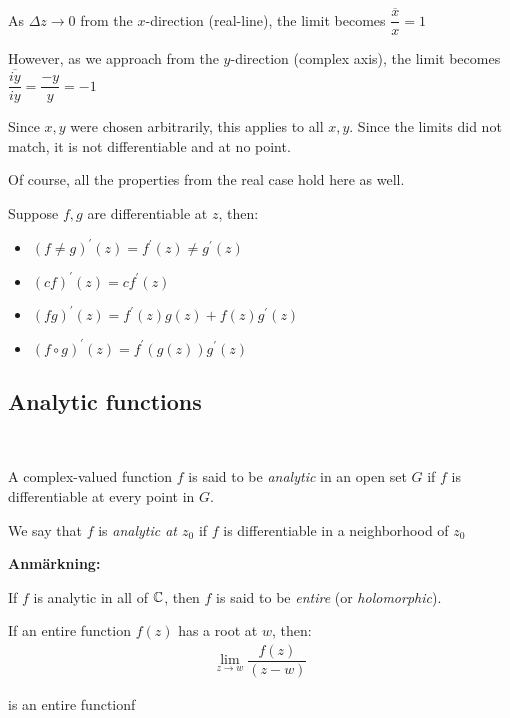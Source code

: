 \noindent As $\Delta z\to0$ from the $x$-direction (real-line), the limit becomes $\dfrac{\overline{x}}{x} = 1$\par
\noindent However, as we approach from the $y$-direction (complex axis), the limit becomes $\dfrac{\overline{iy}}{iy} = \dfrac{-y}{y} = -1$\par
\noindent Since $x,y$ were chosen arbitrarily, this applies to all $x,y$. Since the limits did not match, it is not differentiable and at no point.
\par\bigskip
\noindent Of course, all the properties from the real case hold here as well.\par
\noindent Suppose $f,g$ are differentiable at $z$, then:\par
\begin{itemize}
  \item $(f\neq g)^{\prime}(z) = f^{\prime}(z)\neq g^{\prime}(z)$
  \item $(cf)^{\prime}(z) = cf^{\prime}(z)$
  \item $(fg)^{\prime}(z) = f^{\prime}(z)g(z)+f(z)g^{\prime}(z)$
  \item $(f\circ g)^{\prime}(z) = f^{\prime}(g(z))g^{\prime}(z)$
\end{itemize}
\newpage
\subsection{Analytic functions}\hfill\\
\par\bigskip
\begin{theo}{}
  A complex-valued function $f$ is said to be \textit{analytic} in an open set $G$ if $f$ is differentiable at every point in $G$.
  \par\bigskip
  \noindent We say that $f$ is \textit{analytic at $z_0$}  if $f$ is differentiable in a neighborhood of $z_0$
\end{theo}
\par\bigskip
\noindent\textbf{Anmärkning:}\par
\noindent If $f$ is analytic in all of $\mathbb{C}$, then $f$ is said to be \textit{entire} (or \textit{holomorphic}).
\par\bigskip
\begin{theo}[]{}
  If an entire function $f(z)$ has a root at $w$, then:
  \begin{equation*}
    \begin{gathered}
      \lim_{z\to w}\dfrac{f(z)}{(z-w)}
    \end{gathered}
  \end{equation*}\par
  \noindent is an entire functionf
\end{theo}
